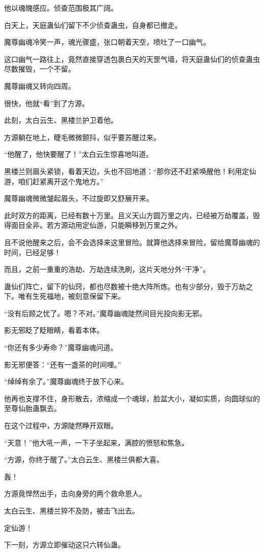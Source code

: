\begin{this_body}
他以魂魄感应。侦查范围极其广阔。

白天上，天庭蛊仙们留下不少侦查蛊虫，自身都已撤走。

魔尊幽魂冷笑一声，魂光骤盛，张口朝着天空，喷吐了一口幽气。

这口幽气一路往上，竟然直接穿透包裹白天的天罡气墙，将天庭蛊仙们的侦查蛊虫尽数摧毁，一个不留。

魔尊幽魂又转向四周。

很快，他就“看”到了方源。

此刻，太白云生、黑楼兰护卫着他。

方源躺在地上，睫毛微微颤抖，似乎要苏醒过来。

“他醒了，他快要醒了！”太白云生惊喜地叫道。

黑楼兰则眉头紧锁，看着天边，头也不回地道：“那你还不赶紧唤醒他！利用定仙游，咱们赶紧离开这个鬼地方。”

魔尊幽魂微微皱起眉头，不过旋即又舒展开来。

此时双方的距离，已经有数十万里。且义天山方圆万里之内，已经被万劫覆盖，毁得面目全非。若方源动用定仙游，只能瞬移到万里之外。

且不说他醒来之后，会不会选择来这里冒险。就算他选择来冒险，留给魔尊幽魂的时间，已经足够！

而且，之前一重重的浩劫、万劫连续洗刷，这片天地分外“干净”。

蛊仙们阵亡，留下的仙窍，都也尽数被十绝大阵所炼。也有少部分，毁于万劫之下。唯有生死福地，被刻意保留下来。

“没有后顾之忧了。嗯？不对。”魔尊幽魂陡然间目光投向影无邪。

影无邪眨了眨眼睛，看着本体。

“你还有多少寿命？”魔尊幽魂问道。

影无邪便答：“还有一盏茶的时间哩。”

“绰绰有余了。”魔尊幽魂终于放下心来。

他再也支撑不住，身形散去，浓缩成一个魂球，脸盆大小，凝如实质，向圆球似的至尊仙胎蛊飘去。

在这个过程中，方源陡然睁开双眼。

“天意！”他大吼一声，一下子坐起来，满腔的愤怒和焦急。

“方源，你终于醒了。”太白云生、黑楼兰俱都大喜。

轰！

方源竟悍然出手，击向身旁的两个救命恩人。

太白云生、黑楼兰猝不及防，被击飞出去。

定仙游！

下一刻，方源立即催动这只六转仙蛊。


\end{this_body}
